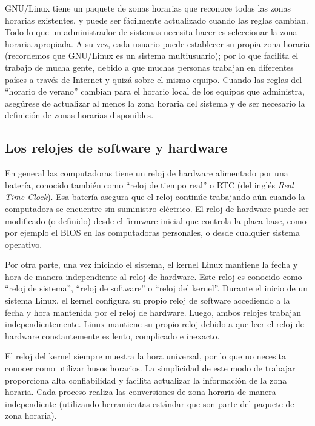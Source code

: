 \documentclass[12pt]{article}
\begin{document}
GNU/Linux tiene un paquete de zonas horarias que reconoce todas las zonas horarias existentes,
y puede ser fácilmente actualizado cuando las reglas cambian. Todo lo que un administrador de 
sistemas necesita hacer es seleccionar la zona horaria apropiada. A su vez, cada usuario 
puede establecer su propia zona horaria (recordemos que GNU/Linux es un sistema multiusuario); 
por lo que facilita el trabajo de mucha gente, debido a que muchas personas trabajan en diferentes 
países a través de Internet y quizá sobre el mismo equipo.
Cuando las reglas del ``horario de verano'' cambian para el horario local de los equipos que 
administra, asegúrese de actualizar al menos la zona horaria del sistema y de ser necesario 
la definición de zonas horarias disponibles. 


\subsection*{Los relojes de software y hardware}


En general las computadoras tiene un reloj de hardware alimentado por una batería, conocido también como 
``reloj de tiempo real'' o RTC (del inglés \textit{Real Time Clock}). 
Esa batería asegura que el reloj continúe trabajando aún cuando la computadora se encuentre sin
suministro eléctrico. El reloj de hardware puede ser modificado (o definido)
desde el firmware inicial que controla la placa base, como por ejemplo el BIOS en las 
computadoras personales, o desde cualquier sistema operativo.

Por otra parte, una vez iniciado el sistema, el kernel Linux mantiene la fecha y hora 
de manera independiente al reloj de hardware. Este reloj es conocido como ``reloj de sistema'', 
``reloj de software'' o ``reloj del kernel''. 
Durante el inicio de un sistema Linux, el kernel configura su propio reloj de software accediendo
a la fecha y hora mantenida por el reloj de hardware.
Luego, ambos relojes trabajan independientemente.
Linux mantiene su propio reloj debido a que leer el reloj de hardware constantemente es 
lento, complicado e inexacto.

El reloj del kernel siempre muestra la hora universal, por lo que
no necesita conocer como utilizar husos horarios. La simplicidad de este
modo de trabajar proporciona alta confiabilidad y facilita actualizar 
la información de la zona horaria. Cada proceso realiza las conversiones de zona horaria 
de manera independiente (utilizando herramientas estándar que son parte del paquete de zona horaria).
\end{document}
